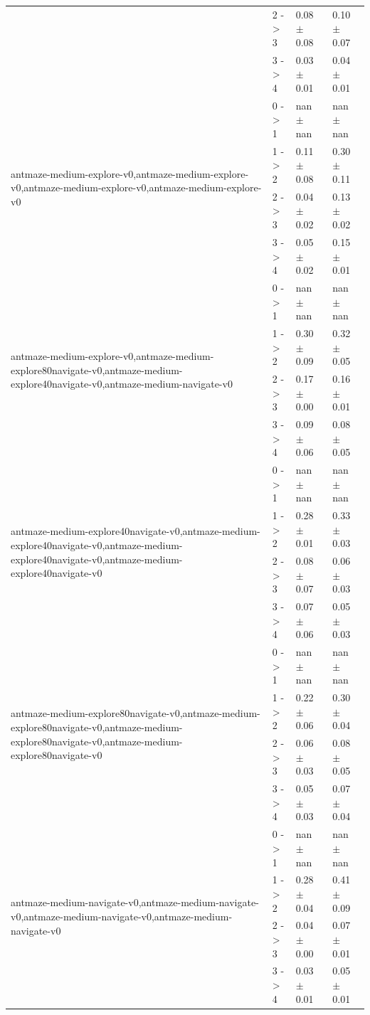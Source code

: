 \begin{tabular}{llll}
 & 2 -> 3 & 0.08 $\pm$ 0.08 & 0.10 $\pm$ 0.07 \\
 & 3 -> 4 & 0.03 $\pm$ 0.01 & 0.04 $\pm$ 0.01 \\
\cline{1-4}
\multirow[t]{4}{*}{antmaze-medium-explore-v0,antmaze-medium-explore-v0,antmaze-medium-explore-v0,antmaze-medium-explore-v0} & 0 -> 1 & nan $\pm$ nan & nan $\pm$ nan \\
 & 1 -> 2 & 0.11 $\pm$ 0.08 & 0.30 $\pm$ 0.11 \\
 & 2 -> 3 & 0.04 $\pm$ 0.02 & 0.13 $\pm$ 0.02 \\
 & 3 -> 4 & 0.05 $\pm$ 0.02 & 0.15 $\pm$ 0.01 \\
\cline{1-4}
\multirow[t]{4}{*}{antmaze-medium-explore-v0,antmaze-medium-explore80navigate-v0,antmaze-medium-explore40navigate-v0,antmaze-medium-navigate-v0} & 0 -> 1 & nan $\pm$ nan & nan $\pm$ nan \\
 & 1 -> 2 & 0.30 $\pm$ 0.09 & 0.32 $\pm$ 0.05 \\
 & 2 -> 3 & 0.17 $\pm$ 0.00 & 0.16 $\pm$ 0.01 \\
 & 3 -> 4 & 0.09 $\pm$ 0.06 & 0.08 $\pm$ 0.05 \\
\cline{1-4}
\multirow[t]{4}{*}{antmaze-medium-explore40navigate-v0,antmaze-medium-explore40navigate-v0,antmaze-medium-explore40navigate-v0,antmaze-medium-explore40navigate-v0} & 0 -> 1 & nan $\pm$ nan & nan $\pm$ nan \\
 & 1 -> 2 & 0.28 $\pm$ 0.01 & 0.33 $\pm$ 0.03 \\
 & 2 -> 3 & 0.08 $\pm$ 0.07 & 0.06 $\pm$ 0.03 \\
 & 3 -> 4 & 0.07 $\pm$ 0.06 & 0.05 $\pm$ 0.03 \\
\cline{1-4}
\multirow[t]{4}{*}{antmaze-medium-explore80navigate-v0,antmaze-medium-explore80navigate-v0,antmaze-medium-explore80navigate-v0,antmaze-medium-explore80navigate-v0} & 0 -> 1 & nan $\pm$ nan & nan $\pm$ nan \\
 & 1 -> 2 & 0.22 $\pm$ 0.06 & 0.30 $\pm$ 0.04 \\
 & 2 -> 3 & 0.06 $\pm$ 0.03 & 0.08 $\pm$ 0.05 \\
 & 3 -> 4 & 0.05 $\pm$ 0.03 & 0.07 $\pm$ 0.04 \\
\cline{1-4}
\multirow[t]{4}{*}{antmaze-medium-navigate-v0,antmaze-medium-navigate-v0,antmaze-medium-navigate-v0,antmaze-medium-navigate-v0} & 0 -> 1 & nan $\pm$ nan & nan $\pm$ nan \\
 & 1 -> 2 & 0.28 $\pm$ 0.04 & 0.41 $\pm$ 0.09 \\
 & 2 -> 3 & 0.04 $\pm$ 0.00 & 0.07 $\pm$ 0.01 \\
 & 3 -> 4 & 0.03 $\pm$ 0.01 & 0.05 $\pm$ 0.01 \\
\cline{1-4}
\bottomrule
\end{tabular}
